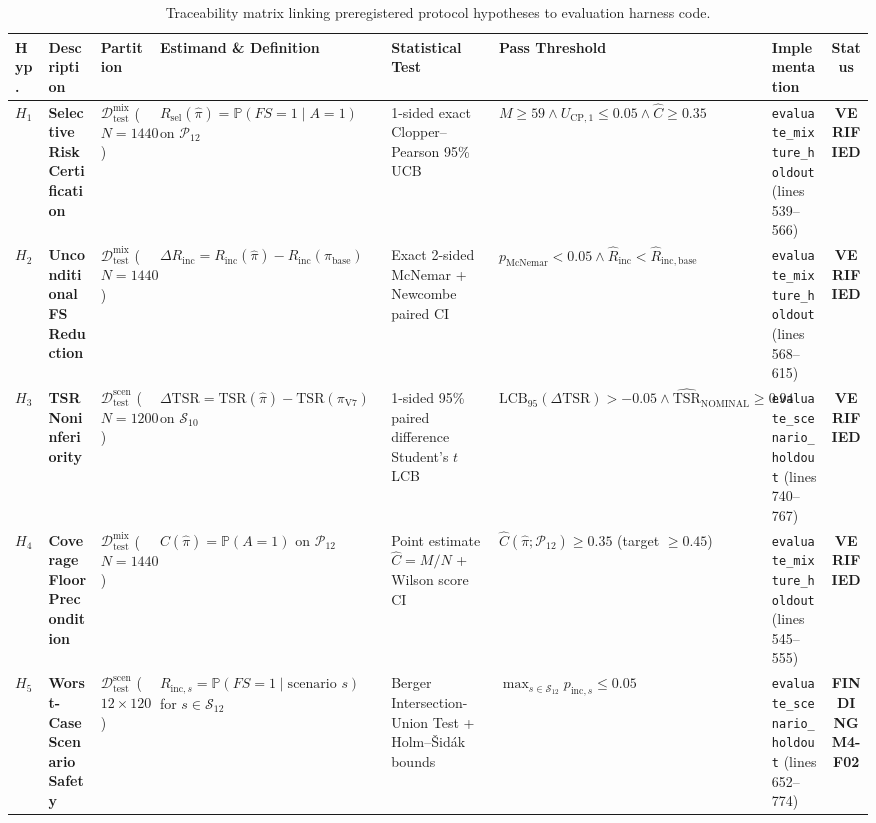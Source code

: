 \documentclass[10pt,a4paper]{article}
\begin{document}
\begin{table}[h!]
\centering
\scriptsize
\begin{tabularx}{\textwidth}{p{0.6cm}p{1.8cm}p{1.3cm}Xp{2.2cm}p{2.3cm}p{2.1cm}c}
\toprule
\textbf{Hyp.} & \textbf{Description} & \textbf{Partition} & \textbf{Estimand \& Definition} & \textbf{Statistical Test} & \textbf{Pass Threshold} & \textbf{Implementation} & \textbf{Status} \\
\midrule
$H_1$ & \textbf{Selective Risk Certification} & $\mathcal{D}_{\mathrm{test}}^{\mathrm{mix}}$ ($N=1440$) & $R_{\mathrm{sel}}(\hat{\pi}) = \mathbb{P}(FS=1 \mid A=1)$ on $\mathcal{P}_{12}$ & 1-sided exact Clopper--Pearson 95\% UCB & $M \ge 59 \land U_{\mathrm{CP},1} \le 0.05 \land \hat{C} \ge 0.35$ & \texttt{evaluate\_mixture\_holdout} (lines 539--566) & \textbf{VERIFIED} \\
\addlinespace
$H_2$ & \textbf{Unconditional FS Reduction} & $\mathcal{D}_{\mathrm{test}}^{\mathrm{mix}}$ ($N=1440$) & $\Delta R_{\mathrm{inc}} = R_{\mathrm{inc}}(\hat{\pi}) - R_{\mathrm{inc}}(\pi_{\mathrm{base}})$ & Exact 2-sided McNemar + Newcombe paired CI & $p_{\mathrm{McNemar}} < 0.05 \land \hat{R}_{\mathrm{inc}} < \hat{R}_{\mathrm{inc, base}}$ & \texttt{evaluate\_mixture\_holdout} (lines 568--615) & \textbf{VERIFIED} \\
\addlinespace
$H_3$ & \textbf{TSR Noninferiority} & $\mathcal{D}_{\mathrm{test}}^{\mathrm{scen}}$ ($N=1200$) & $\Delta \mathrm{TSR} = \mathrm{TSR}(\hat{\pi}) - \mathrm{TSR}(\pi_{\mathrm{V7}})$ on $\mathcal{S}_{10}$ & 1-sided 95\% paired difference Student's $t$ LCB & $\mathrm{LCB}_{95}(\Delta\mathrm{TSR}) > -0.05 \land \widehat{\mathrm{TSR}}_{\mathrm{NOMINAL}} \ge 0.94$ & \texttt{evaluate\_scenario\_holdout} (lines 740--767) & \textbf{VERIFIED} \\
\addlinespace
$H_4$ & \textbf{Coverage Floor Precondition} & $\mathcal{D}_{\mathrm{test}}^{\mathrm{mix}}$ ($N=1440$) & $C(\hat{\pi}) = \mathbb{P}(A=1)$ on $\mathcal{P}_{12}$ & Point estimate $\hat{C} = M/N$ + Wilson score CI & $\hat{C}(\hat{\pi}; \mathcal{P}_{12}) \ge 0.35$ (target $\ge 0.45$) & \texttt{evaluate\_mixture\_holdout} (lines 545--555) & \textbf{VERIFIED} \\
\addlinespace
$H_5$ & \textbf{Worst-Case Scenario Safety} & $\mathcal{D}_{\mathrm{test}}^{\mathrm{scen}}$ ($12 \times 120$) & $R_{\mathrm{inc}, s} = \mathbb{P}(FS=1 \mid \text{scenario } s)$ for $s \in \mathcal{S}_{12}$ & Berger Intersection-Union Test + Holm--Šidák bounds & $\max_{s \in \mathcal{S}_{12}} p_{\mathrm{inc}, s} \le 0.05$ & \texttt{evaluate\_scenario\_holdout} (lines 652--774) & \textbf{FINDING M4-F02} \\
\bottomrule
\end{tabularx}
\caption{Traceability matrix linking preregistered protocol hypotheses to evaluation harness code.}
\label{tab:traceability}
\end{table}
\end{document}
